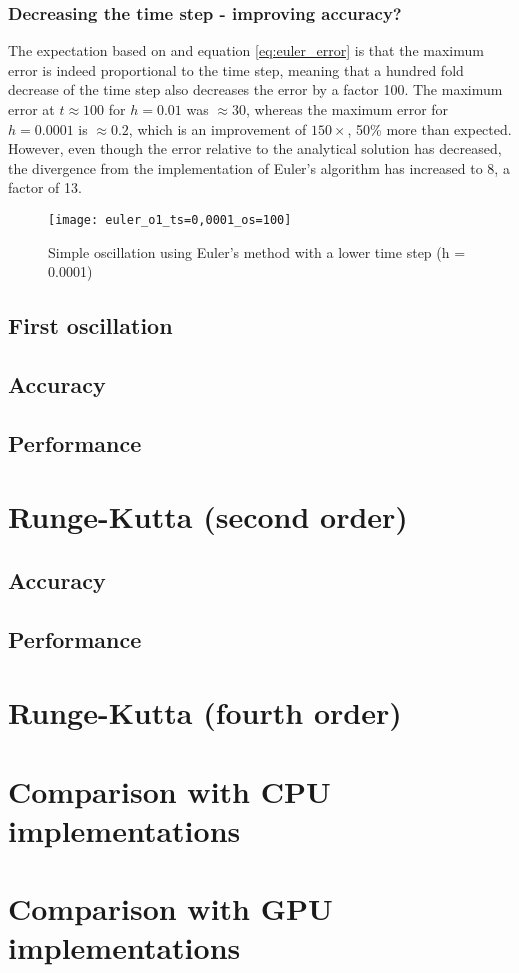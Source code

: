 \subsubsection{Decreasing the time step - improving accuracy?}
The expectation based on \cite{DE} and equation \ref{eq:euler_error} is that the maximum error is indeed proportional to the time step, meaning that a hundred fold decrease of the time step also decreases the error by a factor 100. The maximum error at $t \approx 100$ for $h = 0.01$ was $\approx 30$, whereas the maximum error for $h = 0.0001$ is $\approx 0.2$, which is an improvement of $150 \times$, 50\% more than expected. However, even though the error relative to the analytical solution has decreased, the divergence from the \matlab{} implementation of Euler's algorithm has increased to 8, a factor of 13.
\begin{figure}[h]
	\centering
	\texttt{[image: euler\_o1\_ts=0,0001\_os=100]}
	\caption{Simple oscillation using Euler's method with a lower time step (h = 0.0001)}
	\label{f:euler_o1_ts=0,0001_os=100}
\end{figure}


\subsection{First oscillation}



\subsection{Accuracy}
\subsection{Performance}

\section{Runge-Kutta (second order)}
\subsection{Accuracy}
\subsection{Performance}

\section{Runge-Kutta (fourth order)}

\section{Comparison with CPU implementations}
\section{Comparison with GPU implementations}





